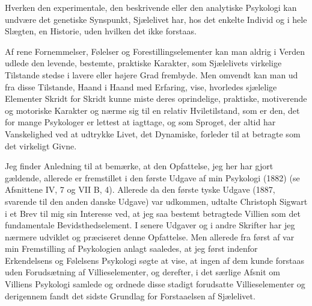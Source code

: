 \documentclass[12pt,a4paper,openany]{book}
\newcommand{\opage}[1]{\marginnote{\footnotesize\textit{[#1]}}}
\begin{document}
Hverken den experimentale, den beskrivende eller den
analytiske Psykologi kan undvære det genetiske Synspunkt,
Sjælelivet har, hos det enkelte Individ og i hele Slægten, en
Historie, uden hvilken det ikke forstaas.

Af rene Fornemmelser, Følelser og Forestillingselementer
kan man aldrig i Verden udlede den levende, bestemte, praktiske
Karakter, som Sjælelivets virkelige Tilstande stedse i
lavere eller højere Grad frembyde. Men omvendt kan man ud
fra disse Tilstande, Haand i Haand med Erfaring, vise, hvorledes
sjælelige Elementer Skridt for Skridt kunne miste deres
oprindelige, praktiske, motiverende og motoriske Karakter og
nærme sig til en relativ Hviletilstand, som er den, det for
mange Psykologer er lettest at iagttage, og som Sproget,  der
\setcounter{footnote}{0}%
\opage{52}altid har Vanskelighed ved at udtrykke Livet, det Dynamiske,
forleder til at betragte som det virkeligt Givne.

Jeg finder Anledning til at bemærke, at den Opfattelse,
jeg her har gjort gældende, allerede er fremstillet i den første
Udgave af min Psykologi (1882) (se Afsnittene IV, 7 og VII
B, 4). Allerede da den første tyske Udgave (1887, svarende til
den anden danske Udgave) var udkommen, udtalte Christoph
Sigwart i et Brev til mig sin Interesse ved, at jeg saa bestemt
betragtede Villien som det fundamentale Bevidsthedselement. I
senere Udgaver og i andre Skrifter har jeg nærmere udviklet
og præciseret denne Opfattelse. Men allerede fra først af var
min Fremstilling af Psykologien anlagt saaledes, at jeg først
indenfor Erkendelsens og Følelsens Psykologi søgte at vise, at
ingen af dem kunde forstaas uden Forudsætning af Villieselementer,
og derefter, i det særlige Afsnit om Villiens Psykologi
samlede og ordnede disse stadigt forudsatte Villieselementer og
derigennem fandt det sidste Grundlag for Forstaaelsen af Sjælelivet.
\end{document}
